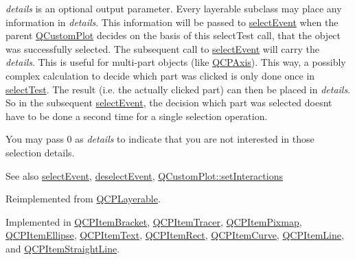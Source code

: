 {\itshape details} is an optional output parameter. Every layerable subclass may place any information in {\itshape details}. This information will be passed to \hyperlink{class_q_c_p_abstract_item_aaf92af7b9893712959a6c073d334d88d}{select\+Event} when the parent \hyperlink{class_q_custom_plot}{Q\+Custom\+Plot} decides on the basis of this select\+Test call, that the object was successfully selected. The subsequent call to \hyperlink{class_q_c_p_abstract_item_aaf92af7b9893712959a6c073d334d88d}{select\+Event} will carry the {\itshape details}. This is useful for multi-\/part objects (like \hyperlink{class_q_c_p_axis}{Q\+C\+P\+Axis}). This way, a possibly complex calculation to decide which part was clicked is only done once in \hyperlink{class_q_c_p_abstract_item_a96d522d10ffc0413b9a366c6f7f0476b}{select\+Test}. The result (i.\+e. the actually clicked part) can then be placed in {\itshape details}. So in the subsequent \hyperlink{class_q_c_p_abstract_item_aaf92af7b9893712959a6c073d334d88d}{select\+Event}, the decision which part was selected doesn\textquotesingle{}t have to be done a second time for a single selection operation.

You may pass 0 as {\itshape details} to indicate that you are not interested in those selection details.

\begin{DoxySeeAlso}{See also}
\hyperlink{class_q_c_p_abstract_item_aaf92af7b9893712959a6c073d334d88d}{select\+Event}, \hyperlink{class_q_c_p_abstract_item_a91f090d6763cfedb0749219c63788ae9}{deselect\+Event}, \hyperlink{class_q_custom_plot_a5ee1e2f6ae27419deca53e75907c27e5}{Q\+Custom\+Plot\+::set\+Interactions} 
\end{DoxySeeAlso}


Reimplemented from \hyperlink{class_q_c_p_layerable_a4001c4d0dfec55598efa4d531f2179a9}{Q\+C\+P\+Layerable}.



Implemented in \hyperlink{class_q_c_p_item_bracket_aa6933caff1d42c54bcebc769ef88c798}{Q\+C\+P\+Item\+Bracket}, \hyperlink{class_q_c_p_item_tracer_ae71f3728421c83c188c117279ca050fd}{Q\+C\+P\+Item\+Tracer}, \hyperlink{class_q_c_p_item_pixmap_a9f8436aa141fa0fb504191c882c2f4d9}{Q\+C\+P\+Item\+Pixmap}, \hyperlink{class_q_c_p_item_ellipse_acd7e5f9528630b2ab5987e2a5782eb7c}{Q\+C\+P\+Item\+Ellipse}, \hyperlink{class_q_c_p_item_text_a285b95bb6634c2e4f7768abb7a8bc69c}{Q\+C\+P\+Item\+Text}, \hyperlink{class_q_c_p_item_rect_af13b0797079b40b73d1c7286b76f18ac}{Q\+C\+P\+Item\+Rect}, \hyperlink{class_q_c_p_item_curve_a741375c11667b5f9c95b2683f93ee514}{Q\+C\+P\+Item\+Curve}, \hyperlink{class_q_c_p_item_line_a7541e5d9378ca121d07b0df3b24f7178}{Q\+C\+P\+Item\+Line}, and \hyperlink{class_q_c_p_item_straight_line_a64cc3796f58ce856012732603edb2f1c}{Q\+C\+P\+Item\+Straight\+Line}.



